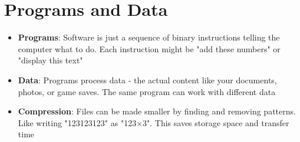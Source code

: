 \section{Programs and Data}
\begin{itemize}
    \item \textbf{Programs}: Software is just a sequence of binary instructions telling the computer what to do. Each instruction might be "add these numbers" or "display this text"
    \item \textbf{Data}: Programs process data - the actual content like your documents, photos, or game saves. The same program can work with different data
    \item \textbf{Compression}: Files can be made smaller by finding and removing patterns. Like writing "123123123" as "123×3". This saves storage space and transfer time
\end{itemize}